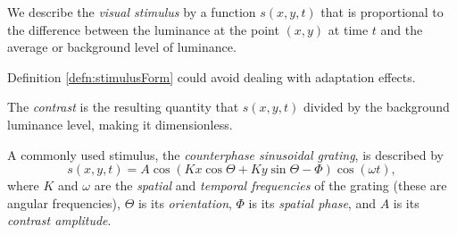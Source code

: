 \begin{defn}
  \label{defn:stimulusForm}
  We describe the \emph{visual stimulus} by a function $s(x,y,t)$ that is proportional to the difference between the luminance at the point $(x,y)$ at time $t$ and the average or background level of luminance.
\end{defn}

\begin{rem}
  Definition \ref{defn:stimulusForm} could avoid dealing with adaptation effects.
\end{rem}

\begin{defn}
  \label{def:contrast}
  The \emph{contrast} is the resulting quantity that $s(x,y,t)$ divided by the background luminance level, making it dimensionless.
\end{defn}
\begin{defn}
  \label{def:counterphaseSinusoidalGrating}
  A commonly used stimulus, the \emph{counterphase sinusoidal grating}, is described by
  \begin{equation}
    \label{equ:2.18}
    s(x,y,t) = A\cos(Kx\cos\Theta + Ky\sin\Theta-\Phi)\cos(\omega t),
  \end{equation}
  where $K$ and $\omega$ are the \emph{spatial} and \emph{temporal frequencies} of the grating (these are angular frequencies), $\Theta$ is its \emph{orientation}, $\Phi$ is its \emph{spatial phase}, and $A$ is its \emph{contrast amplitude}.
\end{defn}

